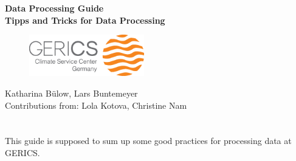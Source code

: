 \documentclass[12pt]{article}              %
\begin{document}

\titlepage
\vspace*{2cm}
\begin{center}
\textbf{\huge{Data Processing Guide}}\\
\vspace*{1cm}
\vspace{1cm}
\textbf{\Large Tipps and Tricks for Data Processing } \\
\vspace*{4cm}
\begin{figure} [h!tb]
\begin{center}
\includegraphics[width=5cm, natwidth=200, natheight=195]{./fig/Logo_GERICS_final.eps} \\
\end{center}
\end{figure}
\normalsize
\vspace*{5cm} 
{\Large{Katharina B{\"u}low, Lars Buntemeyer}}\\
{\Large {Contributions from: Lola Kotova, Christine Nam}}\\
\Large
\vspace*{2cm}
\normalsize
\end{center}


\chapter*{}

This guide is supposed to sum up some good practices for processing data at GERICS. 

\setcounter{page}{2}                    %

\tableofcontents                        %




 



%
%
\appendix
%
%


\end{document}
